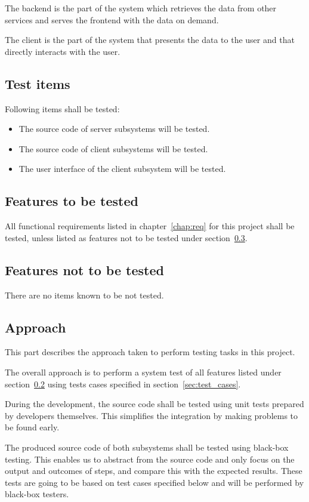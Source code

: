 \documentclass[11pt]{book}
\begin{document}
The backend is the part of the system which retrieves the data from other services and serves the frontend with the data on demand.

The client is the part of the system that presents the data to the user and that directly interacts with the user.

\subsection{Test items}
Following items shall be tested:

\begin{itemize}
    \item The source code of server subsystems will be tested.
    \item The source code of client subsystems will be tested.
    \item The user interface of the client subsystem will be tested.
\end{itemize}

\subsection{Features to be tested} \label{sec:test_plan_features_tested}
All functional requirements listed in chapter~\ref{chap:req} for this project shall be tested, unless listed as features not to be tested under section~\ref{sec:test_plan_features_not_tested}.

\subsection{Features not to be tested} \label{sec:test_plan_features_not_tested}
There are no items known to be not tested.

\subsection{Approach}
This part describes the approach taken to perform testing tasks in this project.

The overall approach is to perform a system test of all features listed under section~\ref{sec:test_plan_features_tested} using tests cases specified in section~\ref{sec:test_cases}.

During the development, the source code shall be tested using unit tests prepared by developers themselves. This simplifies the integration by making problems to be found early.

The produced source code of both subsystems shall be tested using black-box testing. This enables us to abstract from the source code and only focus on the output and outcomes of steps, and compare this with the expected results. These tests are going to be based on test cases specified below and will be performed by black-box testers.
\end{document}
